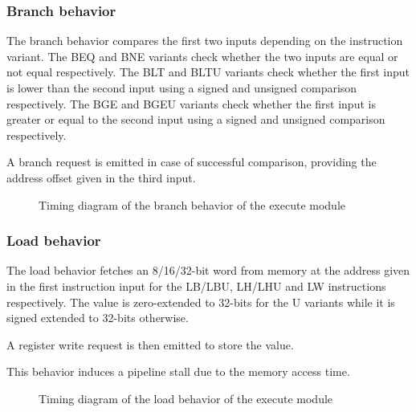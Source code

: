     \subsubsection{Branch behavior}

      \begin{content}
          The branch behavior compares the first two inputs depending on the instruction variant. The BEQ and BNE variants check whether the two inputs are equal or not equal respectively. The BLT and BLTU variants check whether the first input is lower than the second input using a signed and unsigned comparison respectively. The BGE and BGEU variants check whether the first input is greater or equal to the second input using a signed and unsigned comparison respectively.
          
          A branch request is emitted in case of successful comparison, providing the address offset given in the third input.
        \end{content}

      \begin{figure}[H]
          \centering
          
          \caption{Timing diagram of the branch behavior of the execute module}
          \label{fig:exm-behavior-branch}
        \end{figure}

      

    \subsubsection{Load behavior}

      \begin{content}
          The load behavior fetches an 8/16/32-bit word from memory at the address given in the first instruction input for the LB/LBU, LH/LHU and LW instructions respectively. The value is zero-extended to 32-bits for the U variants while it is signed extended to 32-bits otherwise. 
          
          A register write request is then emitted to store the value. 
          
          This behavior induces a pipeline stall due to the memory access time.
        \end{content}

      \begin{figure}[H]
          \centering
          
          \caption{Timing diagram of the load behavior of the execute module}
          \label{fig:exm-behavior-load}
        \end{figure}


